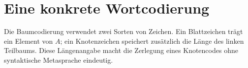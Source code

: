 \documentclass[main.tex]{subfiles}
\begin{document}
\section{Eine konkrete Wortcodierung}

Die Baumcodierung verwendet zwei Sorten von Zeichen. Ein Blattzeichen trägt
ein Element von \(A\); ein Knotenzeichen speichert zusätzlich die Länge des
linken Teilbaums. Diese Längenangabe macht die Zerlegung eines Knotencodes
ohne syntaktische Metasprache eindeutig.


\end{document}
